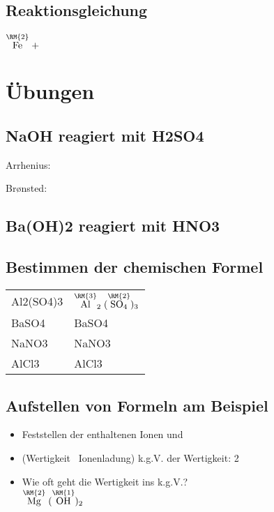 \subsection{Reaktionsgleichung}
$\mathrm{\stackrel{\RM{2}}{Fe}}\;+\;$\\

\newpage

\section{Übungen}
\subsection{\acl{NaOH} reagiert mit \acl{H2SO4}}
Arrhenius: 


Brønsted: 
\subsection{\acl{Ba(OH)2} reagiert mit \acl{HNO3}}


\subsection{Bestimmen der chemischen Formel}
\begin{tabular}{ll}
\acl{Al2(SO4)3} & $\mathrm{\stackrel{\RM{3}}{Al}_2(\stackrel{\RM{2}}{SO_4})_3}$ \\
\acl{BaSO4} & \acs{BaSO4} \\
\acl{NaNO3} & \acs{NaNO3} \\
\acl{AlCl3} & \acs{AlCl3} \\
\end{tabular}

\subsection{Aufstellen von Formeln am Beispiel }
\begin{itemize}
   \item Feststellen der enthaltenen Ionen  und 
   \item (Wertigkeit \entspricht\ Ionenladung) \ac*{k.g.V.} der Wertigkeit: 2
   \item Wie oft geht die Wertigkeit ins \ac*{k.g.V.}?\\
$\mathrm{\stackrel{\RM{2}}{Mg}(\stackrel{\RM{1}}{OH})_2}$
\end{itemize}


